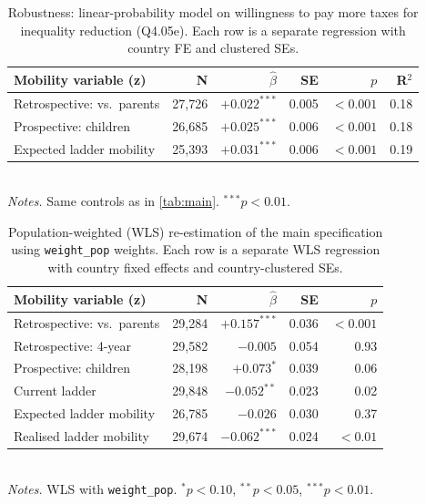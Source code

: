 \documentclass[11pt,a4paper]{article}
\begin{document}
\begin{table}[!ht]
\small
\centering
\caption{Robustness: linear-probability model on willingness to pay more taxes for
inequality reduction (Q4.05e). Each row is a separate regression with country FE and
clustered SEs.}
\label{tab:wtp}
\begin{tabular}{lrrrrr}
\toprule
Mobility variable (z) & N & $\hat\beta$ & SE & $p$ & R$^2$ \\
\midrule
Retrospective: vs.\ parents & 27{,}726 & $+0.022^{***}$ & 0.005 & $<0.001$ & 0.18 \\
Prospective: children       & 26{,}685 & $+0.025^{***}$ & 0.006 & $<0.001$ & 0.18 \\
Expected ladder mobility    & 25{,}393 & $+0.031^{***}$ & 0.006 & $<0.001$ & 0.19 \\
\bottomrule
\end{tabular}
\\\footnotesize \emph{Notes.} Same controls as in \cref{tab:main}. $^{***}p<0.01$.
\end{table}

\begin{table}[!ht]
\small
\centering
\caption{Population-weighted (WLS) re-estimation of the main specification using
\texttt{weight\_pop} weights. Each row is a separate WLS regression with country fixed
effects and country-clustered SEs.}
\label{tab:weighted}
\begin{tabular}{lrrrr}
\toprule
Mobility variable (z) & N & $\hat\beta$ & SE & $p$ \\
\midrule
Retrospective: vs.\ parents & 29{,}284 & $+0.157^{***}$ & 0.036 & $<0.001$ \\
Retrospective: 4-year       & 29{,}582 & $-0.005$       & 0.054 & 0.93     \\
Prospective: children       & 28{,}198 & $+0.073^{*}$   & 0.039 & 0.06     \\
Current ladder              & 29{,}848 & $-0.052^{**}$  & 0.023 & 0.02     \\
Expected ladder mobility    & 26{,}785 & $-0.026$       & 0.030 & 0.37     \\
Realised ladder mobility    & 29{,}674 & $-0.062^{***}$ & 0.024 & $<0.01$  \\
\bottomrule
\end{tabular}
\\\footnotesize \emph{Notes.} WLS with \texttt{weight\_pop}. $^{*}p<0.10$,
$^{**}p<0.05$, $^{***}p<0.01$.
\end{table}
\end{document}
